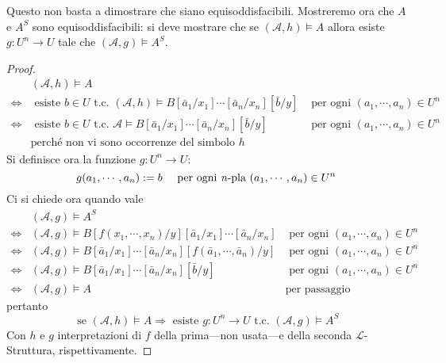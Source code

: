 Questo non basta a dimostrare che siano equisoddisfacibili. Mostreremo ora 
che $A$ e $A^S$ sono equisoddisfacibili: si deve mostrare che 
se $(\mathscr{A}, h) \models A$ allora esiste $g:U^n\rightarrow U$ tale che 
$(\mathscr{A}, g) \models A^S$. 
\begin{proof}
\begin{align*}
  & (\mathscr{A}, h) \models A \\
  \iff & \text{ esiste } b \in U \text{ t.c. } (\mathscr{A}, h) \models B[\bar a_1 / x_1] \cdots [\bar a_n / x_n][\bar b / y] & \text{ per ogni } (a_1, \cdots, a_n) \in U^n \\
  \iff & \text{ esiste } b \in U \text{ t.c. } \mathscr{A} \models B[\bar a_1 / x_1] \cdots [\bar a_n / x_n][\bar b / y] & \text{ per ogni } (a_1, \cdots, a_n) \in U^n \\
  & \text{perché non vi sono occorrenze del simbolo } h
\end{align*}
Si definisce ora la funzione $g: U^n \rightarrow U$:
$$
g(a_1, \cdots, a_n) := b ~~~ \text{ per ogni \textit n-pla } (a_1, \cdots, a_n) \in U^n
$$
Ci si chiede ora quando vale 
\begin{align*}
& (\mathscr{A}, g) \models A^S \\
\iff & (\mathscr{A}, g) \models B[f(x_1, \cdots, x_n)/y][\bar a_1/x_1]\cdots[\bar a_n/x_n] & \text{ per ogni } (a_1, \cdots, a_n) \in U^n \\
  \iff & (\mathscr{A}, g) \models B[\bar a_1/x_1]\cdots[\bar a_n/x_n][f(\bar a_1, \cdots, \bar a_n)/y] & \text{ per ogni } (a_1, \cdots, a_n) \in U^n \\
  \iff & (\mathscr{A}, g) \models B[\bar a_1/x_1]\cdots[\bar a_n/x_n][\bar b/y] & \text{ per ogni } (a_1, \cdots, a_n) \in U^n \\
  \iff & (\mathscr{A}, g) \models A & \text{per passaggio precedente }
\end{align*}
pertanto
$$
\text{ se } (\mathscr{A}, h) \models A \Longrightarrow \text{ esiste } g: U^n \rightarrow U \text{ t.c. } (\mathscr{A}, g) \models A^S 
$$
Con $h$ e $g$ interpretazioni di $f$ della prima—non usata—e della seconda $\mathscr{L}$-Struttura, rispettivamente.
\end{proof}

